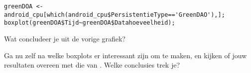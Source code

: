\begin{lstlisting}
greenDOA <- android_cpu[which(android_cpu$PersistentieType=='GreenDAO'),];
boxplot(greenDOA$Tijd~greenDOA$Datahoeveelheid);
\end{lstlisting}

\begin{exercise}
	Wat concludeer je uit de vorige grafiek?
\end{exercise}

\begin{exercise}
	Ga nu zelf na welke boxplots er interessant zijn om te maken, en kijken of jouw resultaten overeen met die van \textcite{Akin2016}. Welke conclusies trek je?
\end{exercise}





